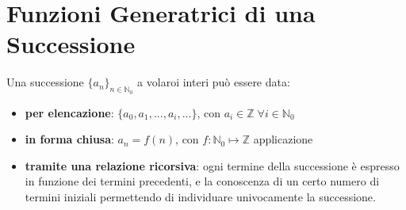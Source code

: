 \chapter{Funzioni Generatrici di una Successione}

Una successione $\{a_n\}_{n \in \mathbb{N}_0}$ a volaroi interi può essere data:
\begin{itemize}[nosep]
    \item \textbf{per elencazione}: $\{a_0, a_1, ..., a_i, ...\}$, con $a_i \in \mathbb{Z} \; \forall i \in \mathbb{N}_0$
    \item \textbf{in forma chiusa}: $a_n = f(n)$, con $f: \mathbb{N}_0 \mapsto \mathbb{Z}$ applicazione
    \item \textbf{tramite una relazione ricorsiva}: ogni termine della successione è espresso in funzione dei termini precedenti, e la conoscenza di un certo numero di termini iniziali permettendo di individuare univocamente la successione.
\end{itemize}

